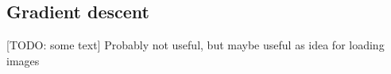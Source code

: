 \documentclass[a4paper]{article}
\begin{document}
\subsection*{Gradient descent}
[TODO: some text]
Probably not useful, but maybe useful as idea for loading images
 \\ \\

\begin{minipage}{\columnwidth}
\makeatletter
\newcommand{\@captype}{figure}
\makeatother
\centering
\captionsetup[subfigure]{labelformat=empty}
\end{minipage}
\end{document}

